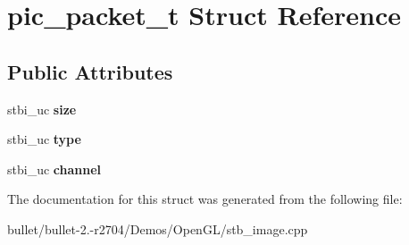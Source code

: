 \hypertarget{structpic__packet__t}{\section{pic\+\_\+packet\+\_\+t Struct Reference}
\label{structpic__packet__t}
}
\subsection*{Public Attributes}
\begin{DoxyCompactItemize}
\item 
\hypertarget{structpic__packet__t_ad33021e40c272a20d89bdcceabb20a71}{stbi\+\_\+uc {\bfseries size}}\label{structpic__packet__t_ad33021e40c272a20d89bdcceabb20a71}

\item 
\hypertarget{structpic__packet__t_abc346cfdcff43f051830335296f14aaa}{stbi\+\_\+uc {\bfseries type}}\label{structpic__packet__t_abc346cfdcff43f051830335296f14aaa}

\item 
\hypertarget{structpic__packet__t_af64f17c991495f3f3baf6782a253f7cc}{stbi\+\_\+uc {\bfseries channel}}\label{structpic__packet__t_af64f17c991495f3f3baf6782a253f7cc}

\end{DoxyCompactItemize}


The documentation for this struct was generated from the following file\+:\begin{DoxyCompactItemize}
\item 
bullet/bullet-\/2.-\/r2704/\+Demos/\+Open\+G\+L/stb\+\_\+image.\+cpp\end{DoxyCompactItemize}
